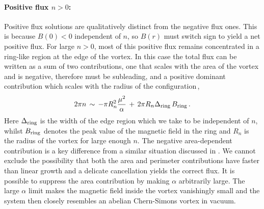 \documentclass[12pt,a4paper]{article}
\def\be{\begin{equation}}
\def\ee{\end{equation}}
\begin{document}
\paragraph{Positive flux $n>0$:} Positive flux solutions are qualitatively distinct from the negative flux ones.  This is because $B(0)<0$ independent of $n$, so 
$B(r)$ must switch sign to yield a net positive flux.  For large $n>0$, most of this positive flux remains concentrated in a ring-like region at the edge of the vortex. In this case the total flux can be written as a sum of two contributions, one that scales with the area of the vortex and is negative, therefore must be subleading, and a positive dominant contribution which scales with the radius of the configuration\,,
\be
2\pi n\,\sim\, -\pi R_n^2\frac{\mu^2}{\alpha}\,+\, 2\pi R_n \Delta_{\rm ring} \, B_{\rm ring}\,.\label{ringansatz}
\ee
Here $\Delta_{\rm ring}$ is the width of the  edge region which we take to be independent of $n$, whilst 
$B_{\rm ring}$
denotes the peak value of the magnetic field in the ring and $R_n$ 
is the radius of the vortex for large enough $n$. The negative area-dependent contribution  is a key difference from a similar situation discussed in \cite{Bolognesi:2007ez}.  We cannot exclude the possibility that both the area and perimeter 
contributions have faster than linear growth and a delicate cancellation yields the correct flux. It is possible to suppress the area contribution by making $\alpha$ arbitrarily large. The large $\alpha$ limit makes the magnetic field inside the vortex vanishingly small and the system then closely resembles an abelian  Chern-Simons vortex in vacuum.  
\end{document}
